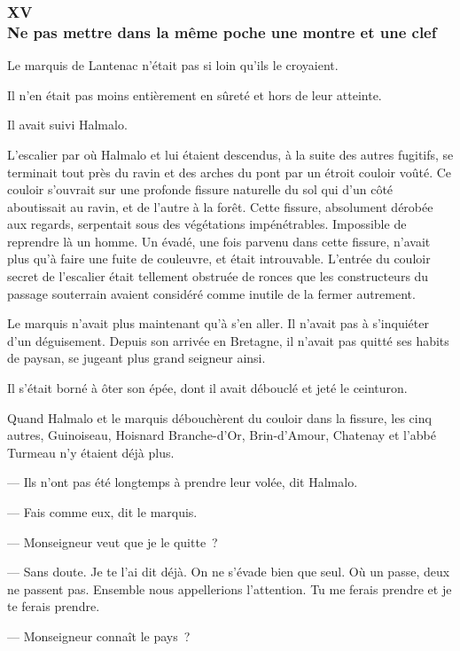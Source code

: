 \documentclass[french,twoside]{book} %
\begin{document}
 \subsubsection[{XV. Ne pas mettre dans la même poche une montre et une clef}]{XV \\
Ne pas mettre dans la même poche une montre et une clef}
\label{p3l4c15}
\noindent Le marquis de Lantenac n’était pas si loin qu’ils le croyaient.\par
Il n’en était pas moins entièrement en sûreté et hors de leur atteinte.\par
Il avait suivi Halmalo.\par
L’escalier par où Halmalo et lui étaient descendus, à la suite des autres fugitifs, se terminait tout près du ravin et des arches du pont par un étroit couloir voûté. Ce couloir s’ouvrait sur une profonde fissure naturelle du sol qui d’un côté aboutissait au ravin, et de l’autre à la forêt. Cette fissure, absolument dérobée aux regards, serpentait sous des végétations impénétrables. Impossible de reprendre là un homme. Un évadé, une fois parvenu dans cette fissure, n’avait plus qu’à faire une fuite de couleuvre, et était introuvable. L’entrée du couloir secret de l’escalier était tellement obstruée de ronces que les constructeurs du passage souterrain avaient considéré comme inutile de la fermer autrement.\par
Le marquis n’avait plus maintenant qu’à s’en aller.  Il n’avait pas à s’inquiéter d’un déguisement. Depuis son arrivée en Bretagne, il n’avait pas quitté ses habits de paysan, se jugeant plus grand seigneur ainsi.\par
Il s’était borné à ôter son épée, dont il avait débouclé et jeté le ceinturon.\par
Quand Halmalo et le marquis débouchèrent du couloir dans la fissure, les cinq autres, Guinoiseau, Hoisnard Branche-d’Or, Brin-d’Amour, Chatenay et l’abbé Turmeau n’y étaient déjà plus.\par
— Ils n’ont pas été longtemps à prendre leur volée, dit Halmalo.\par
— Fais comme eux, dit le marquis.\par
— Monseigneur veut que je le quitte ?\par
— Sans doute. Je te l’ai dit déjà. On ne s’évade bien que seul. Où un passe, deux ne passent pas. Ensemble nous appellerions l’attention. Tu me ferais prendre et je te ferais prendre.\par
— Monseigneur connaît le pays ?\par
\end{document}
